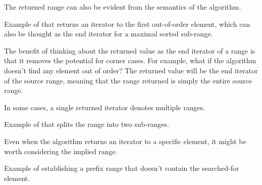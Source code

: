 The returned range can also be evident from the semantics of the algorithm.

\begin{box-note}
\footnotesize Example of  that returns an iterator to the first out-of-order element, which can also be thought as the end iterator for a maximal sorted sub-range.
\tcblower
{}
\end{box-note}

The benefit of thinking about the returned value as the end iterator of a range is that it removes the potential for corner cases. For example, what if the algorithm doesn't find any element out of order? The returned value will be the end iterator of the source range, meaning that the range returned is simply the entire source range.

\newpage

In some cases, a single returned iterator denotes multiple ranges.

\begin{box-note}
\footnotesize Example of  that splits the range into two sub-ranges.
\tcblower
{}
\end{box-note}

Even when the algorithm returns an iterator to a specific element, it might be worth considering the implied range.

\begin{box-note}
\footnotesize Example of  establishing a prefix range that doesn't contain the searched-for element.
\tcblower
{}
\end{box-note}